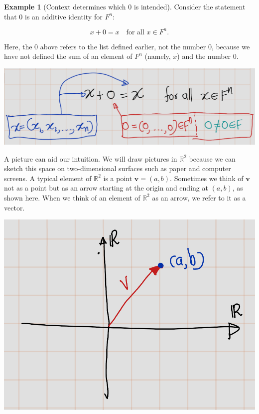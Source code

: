 \documentclass[
]{book}
\theoremstyle{definition}
\theoremstyle{definition}
\newtheorem{example}{Example}[chapter]
\theoremstyle{definition}
\theoremstyle{definition}
\theoremstyle{remark}
\begin{document}
\begin{example}[Context determines which 0 is intended]
\protect\hypertarget{exm:unnamed-chunk-15}{}\label{exm:unnamed-chunk-15}Consider the statement that \(0\) is an additive identity for \(F^n\):

\[ x + 0 = x \quad \text{for all } x \in F^n. \]

Here, the \(0\) above refers to the list defined earlier, not the number \(0\), because we have not defined the sum of an element of \(F^n\) (namely, \(x\)) and the number \(0\).
\end{example}

\includegraphics[width=21in]{fig/Chapter-1/fig2}

A picture can aid our intuition. We will draw pictures in \(\mathbb{R}^2\) because we can sketch this space on two-dimensional surfaces such as paper and computer screens. A typical element of \(\mathbb{R}^2\) is a point \(\mathbf{v} = (a, b)\). Sometimes we think of \(\mathbf{v}\) not as a point but as an arrow starting at the origin and ending at \((a, b)\), as shown here. When we think of an element of \(\mathbb{R}^2\) as an arrow, we refer to it as a vector.

\includegraphics[width=12.75in]{fig/Chapter-1/fig3}
\end{document}
